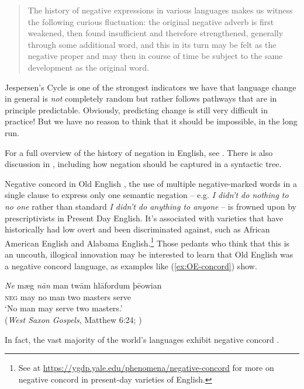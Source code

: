 \begin{quote}
    The history of negative expressions in various languages makes us witness the following curious fluctuation: the original negative adverb is first weakened, then found insufficient and therefore strengthened, generally through some additional word, and this in its turn may be felt as the negative proper and may then in course of time be subject to the same development as the original word.
\end{quote}

\noindent Jespersen's Cycle is one of the strongest indicators we have that language change in general is \emph{not} completely random but rather follows pathways that are in principle predictable. Obviously, predicting change is still very difficult in practice! But we have no reason to think that it should be impossible, in the long run.

For a full overview of the history of negation in English, see \citet{Ingham2013}. There is also discussion in \citet[305--318]{Fischeretal2000}, including how negation should be captured in a syntactic tree.


\begin{miscbox}{Negative concord in Old English}
\label{sec:OE-concord}
, the use of multiple negative-marked words in a single clause to express only one semantic negation -- e.g. \emph{I didn't do nothing to no one} rather than standard \emph{I didn't do anything to anyone} -- is frowned upon by prescriptivists in Present Day English. It's associated with varieties that have historically had low overt  and been discriminated against, such as African American English and Alabama English.\footnote{See \citet{Matyiku2011} at \url{https://ygdp.yale.edu/phenomena/negative-concord} for more on negative concord in present-day varieties of English.} Those pedants who think that this is an uncouth, illogical innovation may be interested to learn that Old English was a negative concord language, as examples like (\ref{ex:OE-concord}) show.

\begin{exe}
    \ex\label{ex:OE-concord}
    \gll \emph{Ne} mæg \emph{nān} man twām hlāfordum þēowian\\
    \textsc{neg} may no man two masters serve\\
    \trans `No man may serve two masters.'\\
    (\emph{West Saxon Gospels}, Matthew 6:24; \citealp[141]{Ingham2013})
\end{exe}

In fact, the vast majority of the world's languages exhibit negative concord \citep{Haspelmath2013}.
\end{miscbox}


